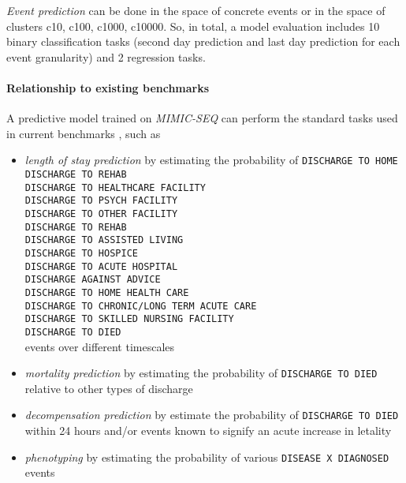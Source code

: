 \emph{Event prediction} can be done in the space of concrete events or in the space of clusters c10, c100, c1000, c10000.
So, in total, a model evaluation includes 10 binary classification tasks (second day prediction and last day prediction for each event granularity) and 2 regression tasks.

\paragraph{Relationship to existing benchmarks}

A predictive model trained on \emph{MIMIC-SEQ} can perform the standard tasks used in current benchmarks \cite{harutyunyanMultitaskLearningBenchmarking2019}, such as
\begin{itemize}
    \item \emph{length of stay prediction} by estimating the probability of \texttt{DISCHARGE TO HOME} \\ \texttt{DISCHARGE TO REHAB} \\ \texttt{DISCHARGE TO HEALTHCARE FACILITY} \\ \texttt{DISCHARGE TO PSYCH FACILITY}\\\texttt{DISCHARGE TO OTHER FACILITY}\\\texttt{DISCHARGE TO REHAB}\\\texttt{DISCHARGE TO ASSISTED LIVING}\\\texttt{DISCHARGE TO HOSPICE}\\\texttt{DISCHARGE TO ACUTE HOSPITAL}\\\texttt{DISCHARGE AGAINST ADVICE} \\ \texttt{DISCHARGE TO HOME HEALTH CARE} \\ \texttt{DISCHARGE TO CHRONIC/LONG TERM ACUTE CARE} \\ \texttt{DISCHARGE TO SKILLED NURSING FACILITY} \\ \texttt{DISCHARGE TO DIED} \\ events over different timescales
    \item \emph{mortality prediction} by estimating the probability of \texttt{DISCHARGE TO DIED} relative to other types of discharge
    \item \emph{decompensation prediction} by estimate the probability of \texttt{DISCHARGE TO DIED} within 24 hours and/or events known to signify an acute increase in letality
    \item \emph{phenotyping} by estimating the probability of various \texttt{DISEASE X DIAGNOSED} events
\end{itemize}

